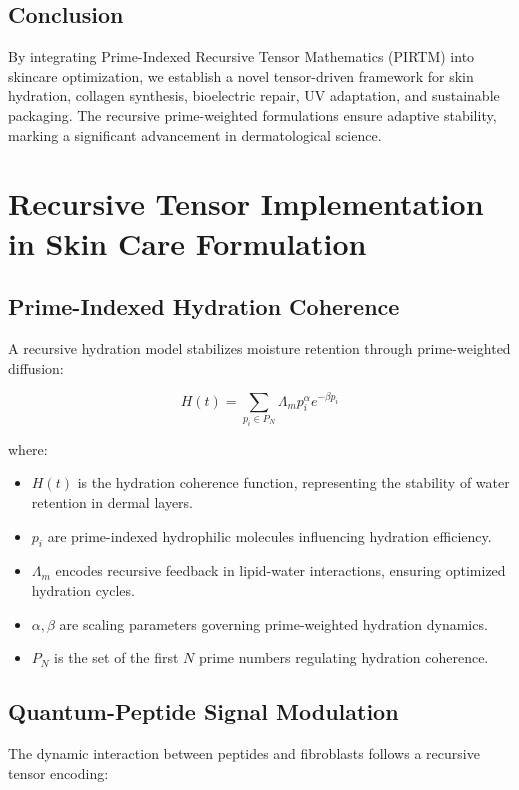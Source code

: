 \documentclass{article}
\theoremstyle{plain}
\theoremstyle{claimstyle}
\begin{document}
\subsection{Conclusion}
By integrating Prime-Indexed Recursive Tensor Mathematics (PIRTM) into skincare optimization, we establish a novel tensor-driven framework for skin hydration, collagen synthesis, bioelectric repair, UV adaptation, and sustainable packaging. The recursive prime-weighted formulations ensure adaptive stability, marking a significant advancement in dermatological science.

\section{Recursive Tensor Implementation in Skin Care Formulation}

\subsection{Prime-Indexed Hydration Coherence}
A recursive hydration model stabilizes moisture retention through prime-weighted diffusion:

\begin{equation}
    H(t) = \sum_{p_i \in P_N} \Lambda_m p_i^{\alpha} e^{-\beta p_i}
\end{equation}

where:
\begin{itemize}
    \item \( H(t) \) is the hydration coherence function, representing the stability of water retention in dermal layers.
    \item \( p_i \) are prime-indexed hydrophilic molecules influencing hydration efficiency.
    \item \( \Lambda_m \) encodes recursive feedback in lipid-water interactions, ensuring optimized hydration cycles.
    \item \( \alpha, \beta \) are scaling parameters governing prime-weighted hydration dynamics.
    \item \( P_N \) is the set of the first \( N \) prime numbers regulating hydration coherence.
\end{itemize}

\subsection{Quantum-Peptide Signal Modulation}
The dynamic interaction between peptides and fibroblasts follows a recursive tensor encoding:
\end{document}
